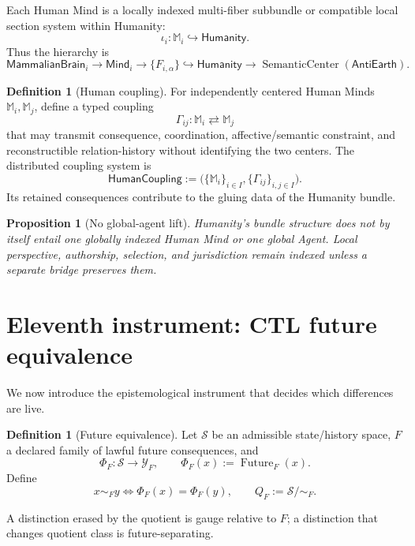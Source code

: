 \documentclass[10pt]{article}
\theoremstyle{pe}
\newtheorem{proposition}[theorem]{Proposition}
\theoremstyle{definition}
\newtheorem{definition}[theorem]{Definition}
\newcommand{\Future}{\operatorname{Future}}
\newcommand{\SC}{\operatorname{SemanticCenter}}
\newcommand{\Mind}{\mathsf{Mind}}
\newcommand{\Brain}{\mathsf{MammalianBrain}}
\newcommand{\Humanity}{\mathsf{Humanity}}
\newcommand{\AntiEarth}{\mathsf{AntiEarth}}
\newcommand{\HumanCoupling}{\mathsf{HumanCoupling}}
\begin{document}
Each Human Mind is a locally indexed multi-fiber subbundle or compatible local section system within Humanity:
\[
  \iota_i:\mathbb M_i\hookrightarrow\Humanity.
\]
Thus the hierarchy is
\[
  \boxed{
  \Brain_i
  \to
  \Mind_i
  \to
  \{F_{i,\alpha}\}
  \hookrightarrow
  \Humanity
  \to
  \SC(\AntiEarth).
  }
\]

\begin{definition}[Human coupling]
For independently centered Human Minds \(\mathbb M_i,\mathbb M_j\), define a typed coupling
\[
  \Gamma_{ij}:
  \mathbb M_i
  \rightleftarrows
  \mathbb M_j
\]
that may transmit consequence, coordination, affective/semantic constraint, and reconstructible relation-history without identifying the two centers.  The distributed coupling system is
\begin{equation}\label{eq:human-coupling}
  \boxed{
  \HumanCoupling
  :=
  \bigl(\{\mathbb M_i\}_{i\in I},\{\Gamma_{ij}\}_{i,j\in I}\bigr).
  }
\end{equation}
Its retained consequences contribute to the gluing data of the Humanity bundle.
\end{definition}

\begin{proposition}[No global-agent lift]
Humanity's bundle structure does not by itself entail one globally indexed Human Mind or one global Agent.  Local perspective, authorship, selection, and jurisdiction remain indexed unless a separate bridge preserves them.
\end{proposition}

\section{Eleventh instrument: CTL future equivalence}

We now introduce the epistemological instrument that decides which differences are live.

\begin{definition}[Future equivalence]
Let \(\mathcal S\) be an admissible state/history space, \(F\) a declared family of lawful future consequences, and
\[
  \Phi_F:\mathcal S\to\mathcal Y_F,
  \qquad
  \Phi_F(x):=\Future_F(x).
\]
Define
\begin{equation}\label{eq:future-equivalence}
  x\sim_Fy
  \iff
  \Phi_F(x)=\Phi_F(y),
  \qquad
  Q_F:=\mathcal S/\!\sim_F.
\end{equation}
\end{definition}

A distinction erased by the quotient is gauge relative to \(F\); a distinction that changes quotient class is future-separating.
\end{document}
